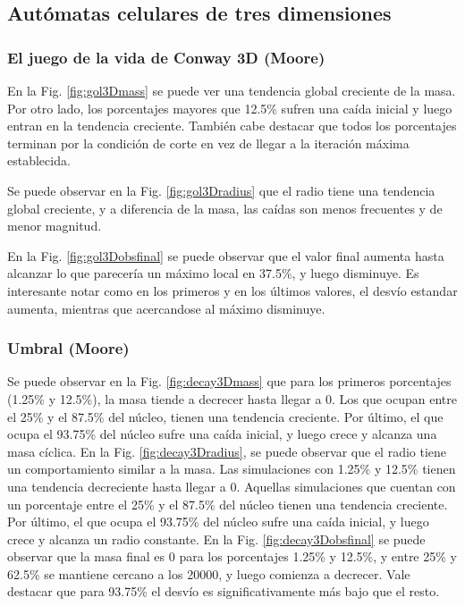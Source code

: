 \subsection{Autómatas celulares de tres dimensiones}
\label{subsec:results3d}

\subsubsection{El juego de la vida de Conway 3D (Moore)}
En la Fig. \ref{fig:gol3Dmass} se puede ver una tendencia global creciente de la masa.
Por otro lado, los porcentajes mayores que 12.5\% sufren una caída inicial y luego entran en la tendencia creciente.
También cabe destacar que todos los porcentajes terminan por la condición de corte en vez de llegar a la iteración máxima establecida.

Se puede observar en la Fig. \ref{fig:gol3Dradius} que el radio tiene una tendencia global creciente, y a diferencia de la masa, las caídas son menos frecuentes y de menor magnitud.

En la Fig. \ref{fig:gol3Dobsfinal} se puede observar que el valor final aumenta hasta alcanzar lo que parecería un máximo local en 37.5\%, y luego disminuye.
Es interesante notar como en los primeros y en los últimos valores, el desvío estandar aumenta, mientras que acercandose al máximo disminuye.


\subsubsection{Umbral (Moore)}
Se puede observar en la Fig. \ref{fig:decay3Dmass} que para los primeros porcentajes (1.25\% y 12.5\%), la masa tiende a decrecer hasta llegar a $0$.
Los que ocupan entre el 25\% y el 87.5\% del núcleo, tienen una tendencia creciente.
Por último, el que ocupa el 93.75\% del núcleo sufre una caída inicial, y luego crece y alcanza una masa cíclica.
En la Fig. \ref{fig:decay3Dradius}, se puede observar que el radio tiene un comportamiento similar a la masa.
Las simulaciones con 1.25\% y 12.5\% tienen una tendencia decreciente hasta llegar a $0$.
Aquellas simulaciones que cuentan con un porcentaje entre el 25\% y el 87.5\% del núcleo tienen una tendencia creciente.
Por último, el que ocupa el 93.75\% del núcleo sufre una caída inicial, y luego crece y alcanza un radio constante.
En la Fig. \ref{fig:decay3Dobsfinal} se puede observar que la masa final es 0 para los porcentajes 1.25\% y 12.5\%, y entre 25\% y 62.5\% se mantiene cercano a los 20000, y luego comienza a decrecer. Vale destacar que para 93.75\% el desvío es significativamente más bajo que el resto.

